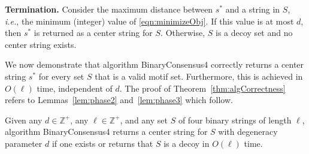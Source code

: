 %

{\bf Termination.}
Consider the maximum distance between $s^*$ and a string in $S$,
{\em i.e.}, the minimum (integer) value of \eqref{eqn:minimizeObj}.
If this value is at most $d$, 
then $s^*$ is returned as a center string for $S$. 
Otherwise, $S$ is a decoy set and no center string exists.

We now demonstrate that algorithm {\sc BinaryConsensus4} correctly returns a 
center string $s^*$ for every set $S$ that is a valid motif set.
Furthermore, this is achieved in $O(\ell)$ time, independent of $d$.
The proof of Theorem~\ref{thm:algCorrectness} refers to 
Lemmas~\ref{lem:phase2} and~\ref{lem:phase3} which follow.

\begin{theorem}
\label{thm:algCorrectness}
Given any $d \in \mathbb{Z}^+$, any $\ell \in \mathbb{Z}^+$,
and any set $S$ of four binary strings of length $\ell$,
algorithm {\sc BinaryConsensus4} 
returns a center string for $S$ with degeneracy parameter $d$
if one exists or returns that $S$ is a decoy
in $O(\ell)$ time.
\end{theorem}

